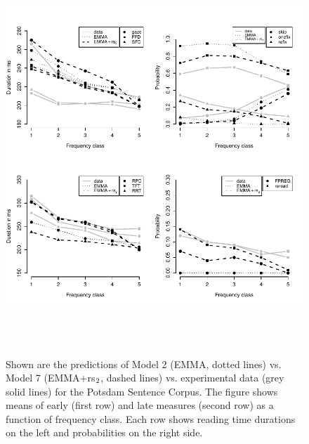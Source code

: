 \documentclass{cambridge7A}\usepackage[]{graphicx}\usepackage[]{color}
\begin{document}
\begin{figure}
\begin{center}
\includegraphics[height=15cm]{figures/fig-psc-fstat}
\end{center}
\caption{Shown are the predictions of Model 2 (EMMA, dotted lines) vs. Model 7 (EMMA+rs$\protect  _2$, dashed lines) vs. experimental data (grey solid lines) for the Potsdam Sentence Corpus. The figure shows means of early (first row) and late measures (second row) as a function of frequency class. Each row shows reading time durations on the left and probabilities on the right side.}
\label{fig:psc}
\end{figure}
\end{document}
